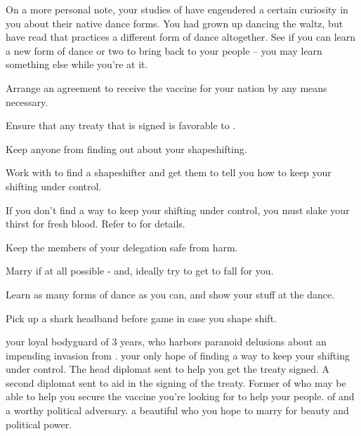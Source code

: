 \documentclass[char]{NeptuneBall}
\begin{document}
On a more personal note, your studies of \pAtlantis{} have engendered a certain curiosity in you about their native dance forms. You had grown up dancing the waltz, but have read that \pAtlantis{} practices a different form of dance altogether. See if you can learn a new form of dance or two to bring back to your people -- you may learn something else while you're at it.

\begin{itemz}[Goals]
  \item Arrange an agreement to receive the \ppolio{} vaccine for your nation by any means necessary.
	\item Ensure that any treaty that is signed is favorable to \pPacifica{}.
	\item Keep anyone from finding out about your shapeshifting.
	\item Work with \cBodyguard{} to find a shapeshifter and get them to tell you how to keep your shifting under control.
	\item If you don't find a way to keep your shifting under control, you must slake your thirst for fresh blood. Refer to \aBloodthirsty{} for details. 
	\item Keep the members of your delegation safe from harm.
	\item Marry \cPrincess{} if at all possible - and, ideally try to get \cPrincess{\them} to fall for you.
	\item Learn as many forms of dance as you can, and show your stuff at the dance.
\end{itemz}

\begin{itemz}[Notes]
  \item Pick up a  shark headband before game in case you shape shift.
\end{itemz}

\begin{contacts}
  \contact{\cBodyguard{}} your loyal bodyguard of 3 years, who harbors paranoid delusions about an impending invasion from \pIndia{}. \cBodyguard{\They} \cBodyguard{\are} your only hope of finding a way to keep your shifting under control.
	\contact{\cDiplomat{}} The head diplomat sent to help you get the treaty signed.
	\contact{\cSpy{}} A second diplomat sent to aid in the signing of the treaty.
	\contact{\cAriel{}} Former \cAriel{\Prince} of \pAtlantis{} who may be able to help you secure the vaccine you're looking for to help your people.
	\contact{\cKing{}} \cKing{\King} of \pAtlantis{} and a worthy political adversary.
	\contact{\cPrincess{}} a beautiful \cPrincess{\Prince} who you hope to marry for \cPrincess{\their} beauty and political power.
\end{contacts}
\end{document}
